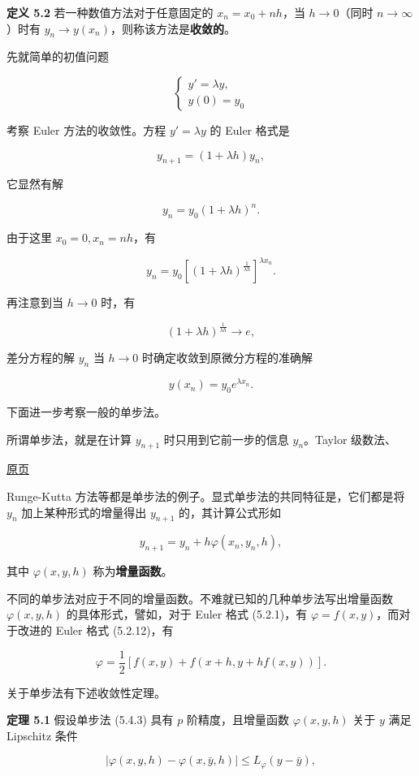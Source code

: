 \documentclass[
  10pt,
  fontset=fandol]{ctexart}
\begin{document}
\textbf{定义 5.2} 若一种数值方法对于任意固定的 \(x_n=x_0+nh\)，当 \(h\to0\)（同时 \(n\to\infty\)）时有 \(y_n\to y(x_n)\)，则称该方法是\textbf{收敛的}。

先就简单的初值问题

\[
\begin{cases}
y'=\lambda y,\\
y(0)=y_0
\end{cases}\tag{5.4.1}
\]

考察 Euler 方法的收敛性。方程 \(y'=\lambda y\) 的 Euler 格式是

\[
y_{n+1}=(1+\lambda h)y_n,\tag{5.4.2}
\]

它显然有解

\[
y_n=y_0(1+\lambda h)^n.
\]

由于这里 \(x_0=0,x_n=nh\)，有

\[
y_n=y_0\left[(1+\lambda h)^{\frac{1}{\lambda h}}\right]^{\lambda x_n}.
\]

再注意到当 \(h\to0\) 时，有

\[
(1+\lambda h)^{\frac{1}{\lambda h}}\to e,
\]

差分方程的解 \(y_n\) 当 \(h\to0\) 时确定收敛到原微分方程的准确解

\[
y(x_n)=y_0e^{\lambda x_n}.
\]

下面进一步考察一般的单步法。

所谓单步法，就是在计算 \(y_{n+1}\) 时只用到它前一步的信息 \(y_n\)。Taylor 级数法、

\href{../../source-images/pdf-134.jpeg}{原页}

Runge-Kutta 方法等都是单步法的例子。显式单步法的共同特征是，它们都是将 \(y_n\) 加上某种形式的增量得出 \(y_{n+1}\) 的，其计算公式形如

\[
y_{n+1}=y_n+h\varphi(x_n,y_n,h),\tag{5.4.3}
\]

其中 \(\varphi(x,y,h)\) 称为\textbf{增量函数}。

不同的单步法对应于不同的增量函数。不难就已知的几种单步法写出增量函数 \(\varphi(x,y,h)\) 的具体形式，譬如，对于 Euler 格式 (5.2.1)，有 \(\varphi=f(x,y)\)，而对于改进的 Euler 格式 (5.2.12)，有

\[
\varphi=\frac12[f(x,y)+f(x+h,y+hf(x,y))].\tag{5.4.4}
\]

关于单步法有下述收敛性定理。

\textbf{定理 5.1} 假设单步法 (5.4.3) 具有 \(p\) 阶精度，且增量函数 \(\varphi(x,y,h)\) 关于 \(y\) 满足 Lipschitz 条件

\[
|\varphi(x,y,h)-\varphi(x,\bar y,h)|\leqslant L_\varphi(y-\bar y),\tag{5.4.5}
\]
\end{document}
